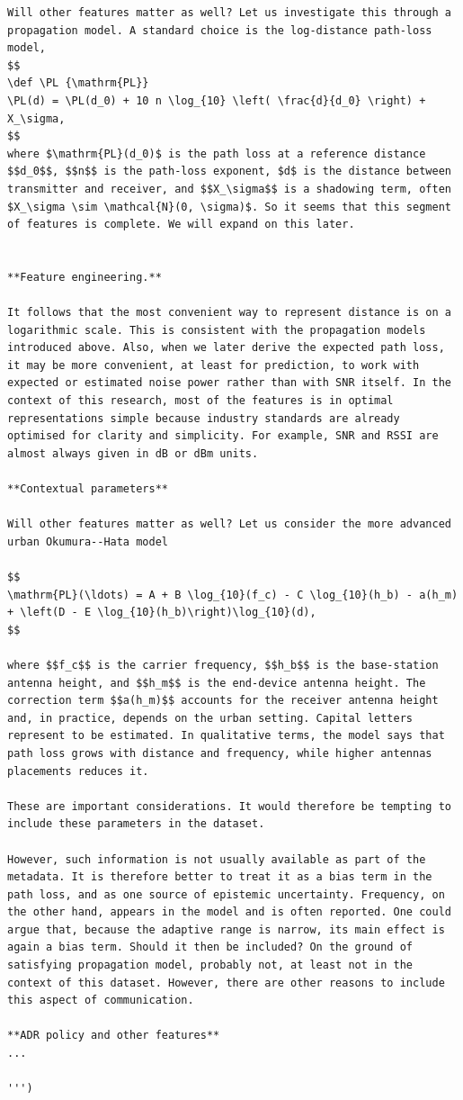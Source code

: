 \documentclass[11pt]{article}
\begin{document}
\begin{verbatim}
Will other features matter as well? Let us investigate this through a propagation model. A standard choice is the log-distance path-loss model,
$$
\def \PL {\mathrm{PL}}
\PL(d) = \PL(d_0) + 10 n \log_{10} \left( \frac{d}{d_0} \right) + X_\sigma,
$$
where $\mathrm{PL}(d_0)$ is the path loss at a reference distance $$d_0$$, $$n$$ is the path-loss exponent, $d$ is the distance between transmitter and receiver, and $$X_\sigma$$ is a shadowing term, often $X_\sigma \sim \mathcal{N}(0, \sigma)$. So it seems that this segment of features is complete. We will expand on this later.


**Feature engineering.**

It follows that the most convenient way to represent distance is on a logarithmic scale. This is consistent with the propagation models introduced above. Also, when we later derive the expected path loss, it may be more convenient, at least for prediction, to work with expected or estimated noise power rather than with SNR itself. In the context of this research, most of the features is in optimal representations simple because industry standards are already optimised for clarity and simplicity. For example, SNR and RSSI are almost always given in dB or dBm units.

**Contextual parameters**

Will other features matter as well? Let us consider the more advanced urban Okumura--Hata model

$$
\mathrm{PL}(\ldots) = A + B \log_{10}(f_c) - C \log_{10}(h_b) - a(h_m) + \left(D - E \log_{10}(h_b)\right)\log_{10}(d),
$$

where $$f_c$$ is the carrier frequency, $$h_b$$ is the base-station antenna height, and $$h_m$$ is the end-device antenna height. The correction term $$a(h_m)$$ accounts for the receiver antenna height and, in practice, depends on the urban setting. Capital letters represent to be estimated. In qualitative terms, the model says that path loss grows with distance and frequency, while higher antennas placements reduces it.

These are important considerations. It would therefore be tempting to include these parameters in the dataset.

However, such information is not usually available as part of the metadata. It is therefore better to treat it as a bias term in the path loss, and as one source of epistemic uncertainty. Frequency, on the other hand, appears in the model and is often reported. One could argue that, because the adaptive range is narrow, its main effect is again a bias term. Should it then be included? On the ground of satisfying propagation model, probably not, at least not in the context of this dataset. However, there are other reasons to include this aspect of communication.

**ADR policy and other features**
...

''')

\end{verbatim}
\end{document}
